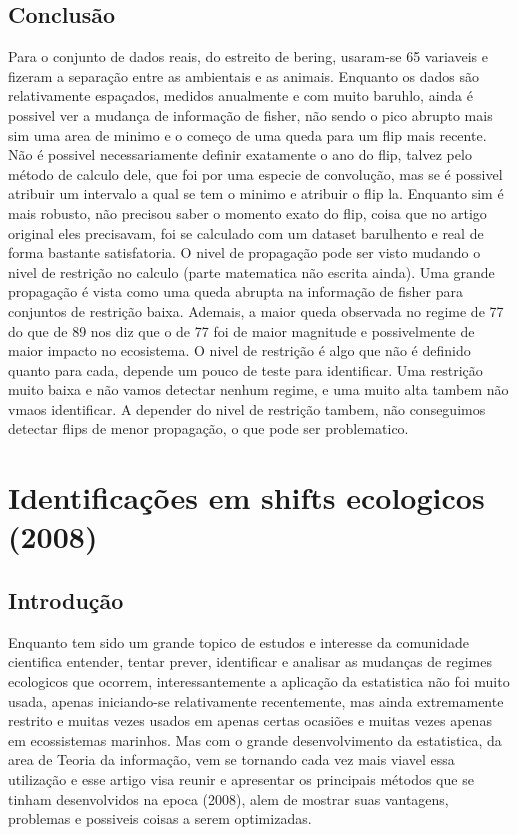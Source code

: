 \subsection{Conclusão}
Para o conjunto de dados reais, do estreito de bering, usaram-se 65 variaveis e fizeram a separação
entre as ambientais e as animais. Enquanto os dados são relativamente espaçados, medidos anualmente
e com muito baruhlo, ainda é possivel ver a mudança de informação de fisher, não sendo o pico
abrupto mais sim uma area de minimo  e o começo de uma queda para um flip mais recente. Não é
possivel necessariamente definir exatamente o ano do flip, talvez pelo método de calculo dele, que
foi por uma especie de convolução, mas se é possivel atribuir um intervalo a qual se tem o minimo e
atribuir o flip la. Enquanto sim é mais robusto, não precisou saber o momento exato do flip, coisa
que no artigo original eles precisavam, foi se calculado com um dataset barulhento e real de forma
bastante satisfatoria. O nivel de propagação pode ser visto mudando o nivel de restrição no calculo
(parte matematica não escrita ainda). Uma grande propagação é vista como uma queda abrupta na
informação de fisher para conjuntos de restrição baixa. Ademais, a maior queda observada no regime
de 77 do que de 89 nos diz que o de 77 foi de maior magnitude e possivelmente de maior impacto no
ecosistema. O nivel de restrição é algo que não é definido quanto para cada, depende um pouco de
teste para identificar. Uma restrição muito baixa e não vamos detectar nenhum regime, e uma muito
alta tambem não vmaos identificar. A depender do nivel de restrição tambem, não conseguimos detectar
flips de menor propagação, o que pode ser problematico.
\section{Identificações em shifts ecologicos (2008)}
\subsection{Introdução}
Enquanto tem sido um grande topico de estudos e interesse da comunidade cientifica entender, tentar
prever, identificar e analisar as mudanças de regimes ecologicos que ocorrem, interessantemente a
aplicação da estatistica não foi muito usada, apenas iniciando-se relativamente recentemente, mas
ainda extremamente restrito e muitas vezes usados em apenas certas ocasiões e muitas vezes apenas em
ecossistemas marinhos. Mas com o grande desenvolvimento da estatistica, da area de Teoria da
informação, vem se tornando cada vez mais viavel essa utilização e esse artigo visa reunir e
apresentar os principais métodos que se tinham desenvolvidos na epoca (2008), alem de mostrar suas
vantagens, problemas e possiveis coisas a serem optimizadas. \par

